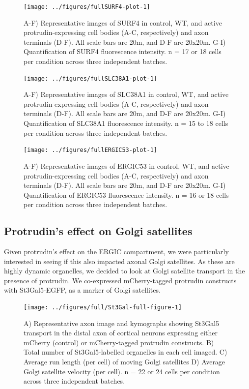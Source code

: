 \documentclass[
  12pt,
  a4paper,
]{book}
\begin{document}
\begin{figure}
\texttt{[image: ../figures/fullSURF4-plot-1]} \caption[SURF4 localisation in protrudin-expressing neurons]{A-F) Representative images of SURF4 in control, WT, and active protrudin-expressing cell bodies (A-C, respectively) and axon terminals (D-F).  All scale bars are 20\textmu{}m, and D-F are 20x20\textmu{}m.  G-I) Quantification of SURF4 fluorescence intensity. n = 17 or 18 cells per condition across three independent batches.}\label{fig:SURF4-plot}
\end{figure}

\begin{figure}
\texttt{[image: ../figures/fullSLC38A1-plot-1]} \caption[SLC38A1 localisation in protrudin-expressing neurons]{A-F) Representative images of SLC38A1 in control, WT, and active protrudin-expressing cell bodies (A-C, respectively) and axon terminals (D-F).  All scale bars are 20\textmu{}m, and D-F are 20x20\textmu{}m.  G-I) Quantification of SLC38A1 fluorescence intensity. n = 15 to 18 cells per condition across three independent batches.}\label{fig:SLC38A1-plot}
\end{figure}

\begin{figure}
\texttt{[image: ../figures/fullERGIC53-plot-1]} \caption[ERGIC53 localisation in protrudin-expressing neurons]{A-F) Representative images of ERGIC53 in control, WT, and active protrudin-expressing cell bodies (A-C, respectively) and axon terminals (D-F).  All scale bars are 20\textmu{}m, and D-F are 20x20\textmu{}m.  G-I) Quantification of ERGIC53 fluorescence intensity. n = 16 or 18 cells per condition across three independent batches.}\label{fig:ERGIC53-plot}
\end{figure}

\hypertarget{protrudins-effect-on-golgi-satellites}{%
\subsection{Protrudin's effect on Golgi satellites}\label{protrudins-effect-on-golgi-satellites}}

Given protrudin's effect on the ERGIC compartment, we were particularly interested in seeing if this also impacted axonal Golgi satellites. As these are highly dynamic organelles, we decided to look at Golgi satellite transport in the presence of protrudin. We co-expressed mCherry-tagged protrudin constructs with St3Gal5-EGFP, as a marker of Golgi satellites.

\begin{figure}
\texttt{[image: ../figures/full/St3Gal-full-figure-1]} \caption[Protrudin effect on Golgi satellite (St3Gal5) transport in the distal axon]{A) Representative axon image and kymographs showing St3Gal5 transport in the distal axon of cortical neurons expressing either mCherry (control) or mCherry-tagged protrudin constructs.  B) Total number of St3Gal5-labelled organelles in each cell imaged.  C) Average run length (per cell) of moving Golgi satellites  D) Average Golgi satellite velocity (per cell).  n = 22 or 24 cells per condition across three independent batches.}\label{fig:St3Gal-full-figure}
\end{figure}
\end{document}
